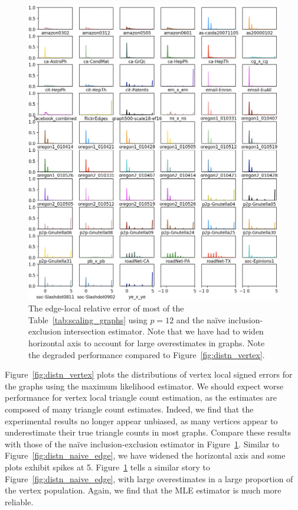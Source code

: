 \documentclass[10]{report}
\begin{document}
\begin{figure}
	\centerline{\includegraphics[width=1.0\columnwidth]{distn_naive_vertex_total}}
	\caption{The edge-local relative error of most of the  Table~\ref{tab:scaling_graphs} using $p=12$ and the na\"ive inclusion-exclusion intersection estimator. 
	Note that we have had to widen horizontal axis to account for large overestimates in graphs. 
	Note the degraded performance compared to Figure~\ref{fig:distn_vertex}.
	\label{fig:distn_naive_vertex}}
\end{figure}


Figure~\ref{fig:distn_vertex} plots the distributions of vertex local signed errors for the graphs using the maximum likelihood estimator. 
We should expect worse performance for vertex local triangle count estimation, as the estimates are composed of many triangle count estimates.
Indeed, we find that the experimental results no longer appear unbiased, as many vertices appear to underestimate their true triangle counts in most graphs. 
Compare these results with those of the na\"ive inclusion-exclusion estimator in Figure~\ref{fig:distn_naive_vertex}.
Similar to Figure~\ref{fig:distn_naive_edge}, we have widened the horizontal axis and some plots exhibit spikes at 5.
Figure~\ref{fig:distn_naive_vertex} tells a similar story to Figure~\ref{fig:distn_naive_edge}, with large overestimates in a large proportion of the vertex population.
Again, we find that the MLE estimator is much more reliable.
\end{document}
